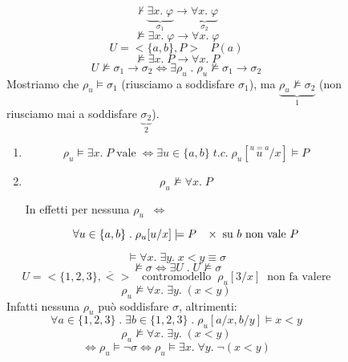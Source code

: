 \documentclass{article}
\theoremstyle{break}
\theoremstyle{break}
\theoremstyle{break}
\theoremstyle{break}
\begin{document}
\begin{figure}[H]
  \begin{exercise}
    \[
      \not\vdash \underbrace{\exists x.\; \varphi}_{\sigma_1}  \to  \underbrace{\forall x.\; \varphi}_{\sigma_2}
    \] 
    \[
    \not\models \exists x.\; \varphi  \to \forall x.\; \varphi 
    \] 
    \[
    U = <\{a,b\}, P> \;\;\; P(a)
    \] 
    \[
    \not\models \exists x.\; P \to \forall x.\; P
    \] 
    \[
    U \not\models \sigma_1 \to \sigma_2 \Leftrightarrow \exists \rho_u \;.\; \rho_u \not\models \sigma_1 \to \sigma_2
    \] 
    Mostriamo che \( \rho_u \models \sigma_1 \) (riusciamo a soddisfare \( \sigma_1 \)), ma
    \( \underbrace{\rho_u \not\models \sigma_2}_{1} \) (non riusciamo mai a soddisfare \( \underbrace{\sigma_2}_{2} \)).
    \begin{enumerate}
      \item 
        \[
          \rho_u \models \exists x.\; P \; \text{vale} \; \Leftrightarrow \exists u \in \{a,b\} \;t.c.\; \rho_u[\stackrel{u = a}{u}/x] \models P
        \] 
      \item \[
      \rho_u \not\models \forall x.\; P
      \] 
      \begin{center}
        In effetti per nessuna \( \rho_u \;\; \Leftrightarrow\) 
      \end{center}
      \[
      \forall u \in \{a,b\} \;.\; \rho_u[u/x] \models P \;\;\; \times \; \text{su \( b \) non vale \( P \)}
      \] 
    \end{enumerate}
  \end{exercise}
\end{figure}

\begin{figure}[H]
  \begin{exercise}
    \[
    \models \forall x.\; \exists y.\; x < y \equiv \sigma 
    \] 
    \[
    \not\models \sigma \Leftrightarrow \exists U \;.\; U \not\models \sigma
    \] 
    \[
    U = < \{1,2,3\}, \overline{<}> \;\;\; \text{contromodello} \;\; \rho_u[3/x] \;\; \text{non fa valere}
    \] 
    \[
    \rho_u \not\models \forall x.\; \exists y.\; (x < y)
    \] 
    Infatti nessuna \( \rho_u \) può soddisfare \( \sigma  \), altrimenti:
    \[
    \forall a \in \{1,2,3\} \;.\; \exists b \in \{1,2,3\} \;.\; \rho_u[a/x, b/y] \models x < y
    \] 
    \[
    \rho_u \not\models \forall x.\; \exists y.\; (x < y)
    \] 
    \[
    \Leftrightarrow \rho_u \models \neg \sigma \Leftrightarrow \rho_u \models \exists x.\; \forall y.\; \neg(x < y)
    \] 
  \end{exercise}
\end{figure}
\end{document}
